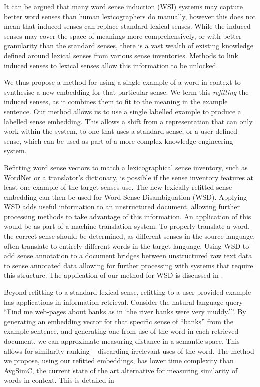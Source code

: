 \documentclass{sig-alternate}
\begin{document}
It can be argued that many word sense induction (WSI) systems may capture better word senses than human lexicographers do manually, however this does not mean that induced senses can replace standard lexical senses. While the induced senses may cover the space of meanings more comprehensively, or with better granularity than the standard senses, there is a vast wealth of existing knowledge defined around lexical senses from various sense inventories. Methods to link induced senses to lexical senses allow this information to be unlocked.


We thus propose a method for using a single example of a word in context to synthesise a new embedding for that particular sense. We term this \emph{refitting} the induced senses, as it combines them to fit to the meaning in the example sentence. Our method allows us to use a single labelled example to produce a labelled sense embedding. This allows a shift from a representation that can only work within the system, to one that uses a standard sense, or a user defined sense, which can be used as part of a more complex knowledge engineering system. 

Refitting word sense vectors to match a lexicographical sense inventory, such as WordNet or a translator's dictionary, is possible if the sense inventory features at least one example of the target senses use. The new lexically refitted sense embedding can then be used for Word Sense Disambiguation (WSD). Applying WSD adds useful information to an unstructured document, allowing further processing methods to take advantage of this information. An application of this would be as part of a machine translation system. To properly translate a word, the correct sense should be determined, as different senses in the source language, often translate to entirely different words in the target language. Using WSD to add sense annotation to a document bridges between unstructured raw text data to sense annotated data allowing for further processing with systems that require this structure. The application of our method for WSD is discussed in .

Beyond refitting to a standard lexical sense, refitting to a user provided example has applications in information retrieval. Consider the natural language query \enquote{Find me web-pages about banks as in \enquote{the river banks were very muddy.}}. By generating an embedding vector for that specific sense of ``banks'' from the example sentence, and generating one from use of the word in each retrieved document, we can approximate measuring distance in a semantic space. This allows for similarity ranking -- discarding irrelevant uses of the word. The method we propose, using our refitted embeddings, has lower time complexity than AvgSimC, the current state of the art alternative for measuring similarity of words in context. This is detailed in 
\end{document}
